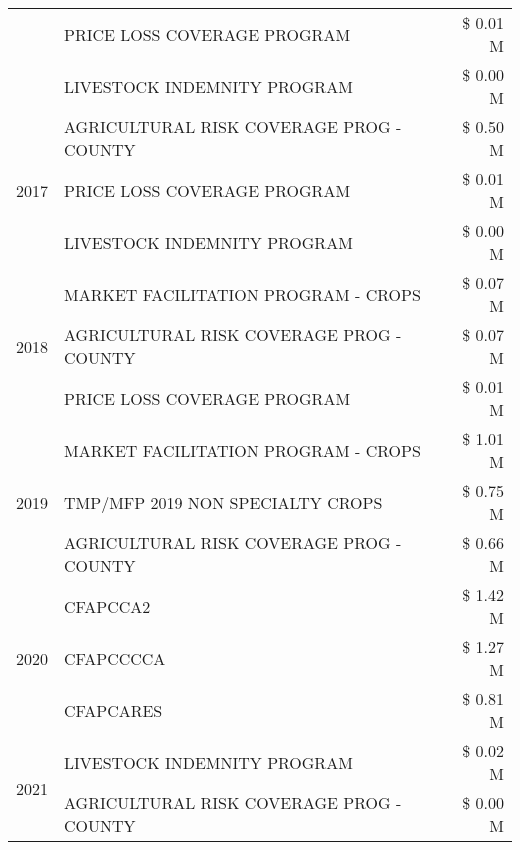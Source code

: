 \begin{tabular}{llr}
 & PRICE LOSS COVERAGE PROGRAM & \$ 0.01 M \\
 & LIVESTOCK INDEMNITY PROGRAM & \$ 0.00 M \\
\cline{1-3}
\multirow[t]{3}{*}{2017} & AGRICULTURAL RISK COVERAGE PROG - COUNTY & \$ 0.50 M \\
 & PRICE LOSS COVERAGE PROGRAM & \$ 0.01 M \\
 & LIVESTOCK INDEMNITY PROGRAM & \$ 0.00 M \\
\cline{1-3}
\multirow[t]{3}{*}{2018} & MARKET FACILITATION PROGRAM - CROPS & \$ 0.07 M \\
 & AGRICULTURAL RISK COVERAGE PROG - COUNTY & \$ 0.07 M \\
 & PRICE LOSS COVERAGE PROGRAM & \$ 0.01 M \\
\cline{1-3}
\multirow[t]{3}{*}{2019} & MARKET FACILITATION PROGRAM - CROPS & \$ 1.01 M \\
 & TMP/MFP 2019 NON SPECIALTY CROPS & \$ 0.75 M \\
 & AGRICULTURAL RISK COVERAGE PROG - COUNTY & \$ 0.66 M \\
\cline{1-3}
\multirow[t]{3}{*}{2020} & CFAPCCA2 & \$ 1.42 M \\
 & CFAPCCCCA & \$ 1.27 M \\
 & CFAPCARES & \$ 0.81 M \\
\cline{1-3}
\multirow[t]{2}{*}{2021} & LIVESTOCK INDEMNITY PROGRAM & \$ 0.02 M \\
 & AGRICULTURAL RISK COVERAGE PROG - COUNTY & \$ 0.00 M \\
\cline{1-3}
\bottomrule
\end{tabular}
